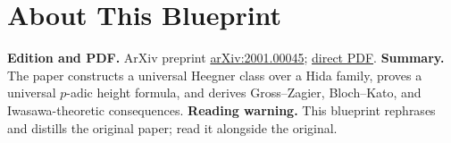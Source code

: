 

\chapter*{About This Blueprint}
\label{universal-p-adic-gross-zagier-formula-about}

\textbf{Edition and PDF.} ArXiv preprint \href{https://arxiv.org/abs/2001.00045}{arXiv:2001.00045};
\href{https://arxiv.org/pdf/2001.00045}{direct PDF}.
\textbf{Summary.} The paper constructs a universal Heegner class over a Hida family, proves a universal $p$-adic
height formula, and derives Gross--Zagier, Bloch--Kato, and Iwasawa-theoretic consequences.
\textbf{Reading warning.} This blueprint rephrases and distills the original paper; read it alongside the original.














